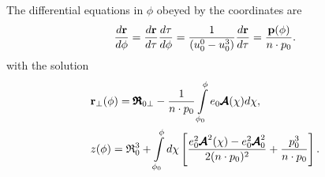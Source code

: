 The differential equations in \(\phi\) obeyed by the coordinates are
\begin{equation}
    \frac{d{\bf r}}{d\phi}=\frac{d{\bf r}}{d\tau}\frac{d\tau}{d\phi}=\frac{1}{(u_0^0-u_0^3)}\frac{d{\bf r}}{d\tau}=\frac{{\bf p}(\phi)}{n\cdot p_0}.
\end{equation}
with the solution
\begin{align}
     & {\bf r}_{\perp}(\phi)={\pmb{\mathfrak R}}_{0\perp}-\frac{1}{n\cdot p_0}\int\limits_{\phi_0}^{\phi}e_0{\pmb{\cal A}}(\chi)d\chi,                                                \\
     & z(\phi)={\mathfrak R}_{0}^3+\int\limits_{\phi_0}^{\phi}d\chi\left[\frac{e_0^2{\pmb{\cal A}}^2(\chi)-e_0^2{\pmb{\cal A}}^2_0}{2(n\cdot p_0)^2}+\frac{p_0^3}{n\cdot p_0}\right].
\end{align}

